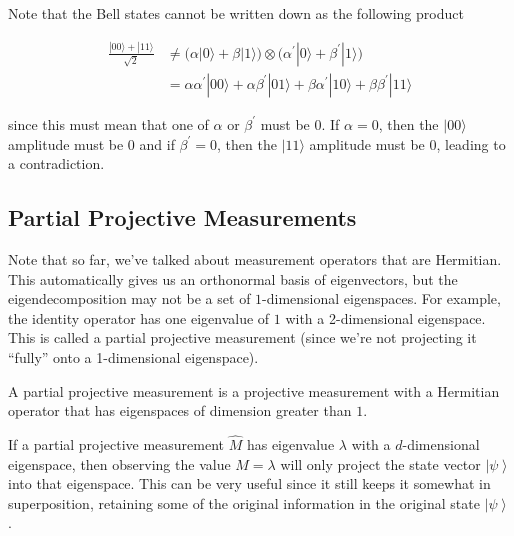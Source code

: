 \documentclass{article}
\newcommand{\ket}[1]{\ensuremath{\left|#1\right\rangle}}
\begin{document}
    Note that the Bell states cannot be written down as the following product

    \begin{align*}
      \frac{|00\rangle + |11 \rangle}{\sqrt{2}} & \neq \big(\alpha |0\rangle + \beta |1\rangle \big) \otimes \big( \alpha^\prime |0 \rangle + \beta^\prime |1\rangle \big) \\
      & = \alpha \alpha^\prime |00\rangle + \alpha \beta^\prime |01\rangle + \beta \alpha^\prime |10\rangle + \beta \beta^\prime |11\rangle
    \end{align*}

    since this must mean that one of $\alpha$ or $\beta^\prime$ must be $0$. If $\alpha = 0$, then the $|00\rangle$ amplitude must be $0$ and if $\beta^\prime = 0$, then the $|11\rangle$ amplitude must be $0$, leading to a contradiction.

  \subsection{Partial Projective Measurements}

    Note that so far, we've talked about measurement operators that are Hermitian. This automatically gives us an orthonormal basis of eigenvectors, but the eigendecomposition may not be a set of $1$-dimensional eigenspaces. For example, the identity operator has one eigenvalue of $1$ with a 2-dimensional eigenspace. This is called a partial projective measurement (since we're not projecting it ``fully'' onto a 1-dimensional eigenspace). 

    \begin{definition}
      A partial projective measurement is a projective measurement with a Hermitian operator that has eigenspaces of dimension greater than $1$. 
    \end{definition}

    If a partial projective measurement $\hat{M}$ has eigenvalue $\lambda$ with a $d$-dimensional eigenspace, then observing the value $M = \lambda$ will only project the state vector $\ket{\psi}$ into that eigenspace. This can be very useful since it still keeps it somewhat in superposition, retaining some of the original information in the original state $\ket{\psi}$. 
\end{document}

